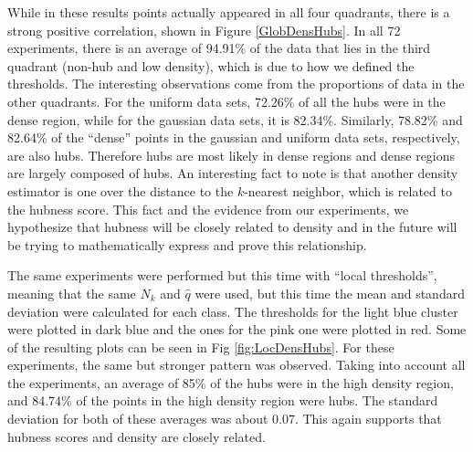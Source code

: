 \documentclass[graybox]{svmult}
\begin{document}
While in these results points actually appeared in all four quadrants, there is a strong positive correlation, shown in Figure \ref{GlobDensHubs}. In all 72 experiments, there is an average of 94.91\% of the data that lies in the third quadrant (non-hub and low density), which is due to how we defined the thresholds. The interesting observations come from the proportions of data in the other quadrants. For the uniform data sets, 72.26\% of all the hubs were in the dense region, while for the gaussian data sets, it is 82.34\%. Similarly, 78.82\% and 82.64\% of the ``dense'' points in the gaussian and uniform data sets, respectively, are also hubs. Therefore hubs are most likely in dense regions and dense regions are largely composed of hubs. An interesting fact to note is that another density estimator is one over the distance to the $k$-nearest neighbor, which is related to the hubness score. This fact and the evidence from our experiments, we hypothesize that hubness will be closely related to density and in the future will be trying to mathematically express and prove this relationship.

The same experiments were performed but this time with ``local thresholds'', meaning that the same $N_k$ and $\hat{q}$ were used, but this time the mean and standard deviation were calculated for each class. The thresholds for the light blue cluster were plotted in dark blue and the ones for the pink one were plotted in red. Some of the resulting plots can be seen in Fig \ref{fig:LocDensHubs}. For these experiments, the same but stronger pattern was observed. Taking into account all the experiments, an average of 85\% of the hubs were in the high density region, and 84.74\% of the points in the high density region were hubs. The standard deviation for both of these averages was about 0.07. This again supports that hubness scores and density are closely related. 
\end{document}
